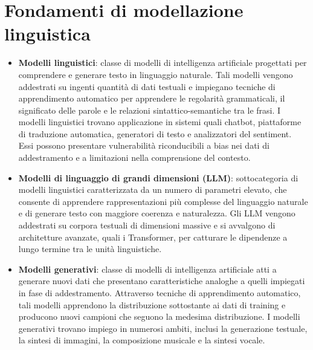 \section{Fondamenti di modellazione linguistica}
\begin{itemize}
	\item \textbf{Modelli linguistici}: classe di modelli di intelligenza artificiale progettati per comprendere e generare testo in linguaggio naturale. Tali modelli vengono addestrati su ingenti quantità di dati testuali e impiegano tecniche di apprendimento automatico per apprendere le regolarità grammaticali, il significato delle parole e le relazioni sintattico-semantiche tra le frasi. I modelli linguistici trovano applicazione in sistemi quali chatbot, piattaforme di traduzione automatica, generatori di testo e analizzatori del sentiment. Essi possono presentare vulnerabilità riconducibili a bias nei dati di addestramento e a limitazioni nella comprensione del contesto.
	\item \textbf{Modelli di linguaggio di grandi dimensioni (LLM)}: sottocategoria di modelli linguistici caratterizzata da un numero di parametri elevato, che consente di apprendere rappresentazioni più complesse del linguaggio naturale e di generare testo con maggiore coerenza e naturalezza. Gli LLM vengono addestrati su corpora testuali di dimensioni massive e si avvalgono di architetture avanzate, quali i Transformer, per catturare le dipendenze a lungo termine tra le unità linguistiche.
	\item \textbf{Modelli generativi}: classe di modelli di intelligenza artificiale atti a generare nuovi dati che presentano caratteristiche analoghe a quelli impiegati in fase di addestramento. Attraverso tecniche di apprendimento automatico, tali modelli apprendono la distribuzione sottostante ai dati di training e producono nuovi campioni che seguono la medesima distribuzione. I modelli generativi trovano impiego in numerosi ambiti, inclusi la generazione testuale, la sintesi di immagini, la composizione musicale e la sintesi vocale.
\end{itemize}

